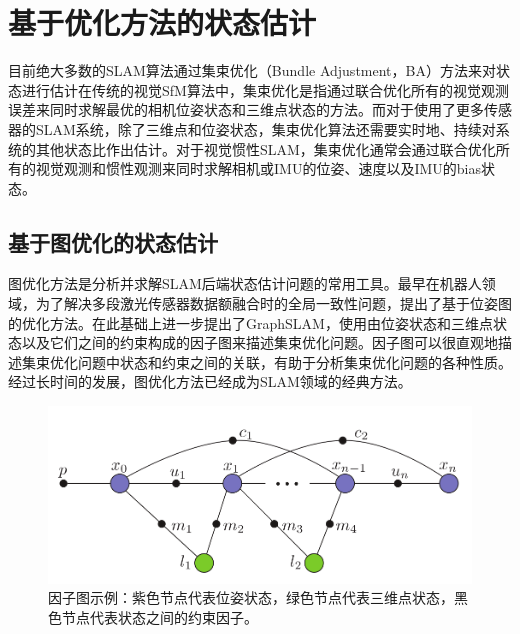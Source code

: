 \section{基于优化方法的状态估计}

目前绝大多数的SLAM算法通过集束优化\citep{triggs1999bundle}（Bundle Adjustment，BA）方法来对状态进行估计在传统的视觉SfM算法中，集束优化是指通过联合优化所有的视觉观测误差来同时求解最优的相机位姿状态和三维点状态的方法。而对于使用了更多传感器的SLAM系统，除了三维点和位姿状态，集束优化算法还需要实时地、持续对系统的其他状态比作出估计。对于视觉惯性SLAM，集束优化通常会通过联合优化所有的视觉观测和惯性观测来同时求解相机或IMU的位姿、速度以及IMU的bias状态。

\subsection{基于图优化的状态估计}

图优化方法是分析并求解SLAM后端状态估计问题的常用工具。最早在机器人领域，为了解决多段激光传感器数据额融合时的全局一致性问题，\citep{lu1997globally,lu1997robot}提出了基于位姿图的优化方法。\citeauthor{thrun2006graph}在此基础上进一步提出了GraphSLAM\citep{thrun2006graph}，使用由位姿状态和三维点状态以及它们之间的约束构成的因子图来描述集束优化问题。因子图可以很直观地描述集束优化问题中状态和约束之间的关联，有助于分析集束优化问题的各种性质。经过长时间的发展，图优化方法已经成为SLAM领域的经典方法。

\begin{figure}[htb!]
    \centering
    \includegraphics[width=.8\textwidth]{figs/isam_factor_graph.png}
    \caption{因子图示例\citep{kaess2012isam2}：紫色节点代表位姿状态，绿色节点代表三维点状态，黑色节点代表状态之间的约束因子。}
    \label{fig:isam_factor_graph}
\end{figure}

